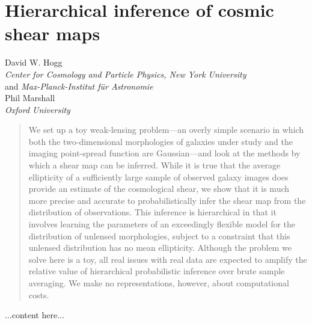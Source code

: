 \documentclass[12pt]{article}
\begin{document}
\section*{Hierarchical inference of cosmic shear maps}
\noindent
David W. Hogg \\
\textsl{Center for Cosmology and Particle Physics, New York University} \\
and \textsl{Max-Planck-Institut f\"ur Astronomie} \\[1ex]
Phil Marshall \\
\textsl{Oxford University}

\begin{abstract}
We set up a toy weak-lensing problem---an overly simple scenario in
which both the two-dimensional morphologies of galaxies under study
and the imaging point-spread function are Gaussian---and look at the
methods by which a shear map can be inferred.  While it is true that
the average ellipticity of a sufficiently large sample of observed
galaxy images does provide an estimate of the cosmological shear, we
show that it is much more precise and accurate to probabilistically
infer the shear map from the distribution of observations.  This
inference is hierarchical in that it involves learning the parameters
of an exceedingly flexible model for the distribution of unlensed
morphologies, subject to a constraint that this unlensed distribution
has no mean ellipticity.  Although the problem we solve here is a toy,
all real issues with real data are expected to amplify the relative
value of hierarchical probabilistic inference over brute sample
averaging.  We make no representations, however, about computational
costs.
\end{abstract}

...content here...
\end{document}
